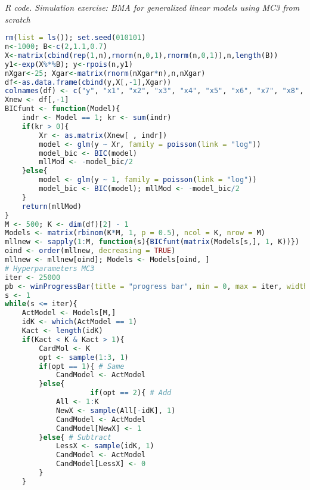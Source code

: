 \begin{tcolorbox}[enhanced,width=4.67in,center upper,
	fontupper=\large\bfseries,drop shadow southwest,sharp corners]
	\textit{R code. Simulation exercise: BMA for generalized linear models using MC3 from scratch}
	\begin{VF}
		\begin{lstlisting}[language=R]
rm(list = ls()); set.seed(010101)
n<-1000; B<-c(2,1.1,0.7)
X<-matrix(cbind(rep(1,n),rnorm(n,0,1),rnorm(n,0,1)),n,length(B))
y1<-exp(X%*%B); y<-rpois(n,y1)
nXgar<-25; Xgar<-matrix(rnorm(nXgar*n),n,nXgar)
df<-as.data.frame(cbind(y,X[,-1],Xgar))
colnames(df) <- c("y", "x1", "x2", "x3", "x4", "x5", "x6", "x7", "x8", "x9", "x10", "x11", "x12", "x13", "x14", "x15", "x16", "x17", "x18", "x19", "x20", "x21", "x22", "x23", "x24", "x25", "x26", "x27")
Xnew <- df[,-1]
BICfunt <- function(Model){
	indr <- Model == 1; kr <- sum(indr)
	if(kr > 0){
		Xr <- as.matrix(Xnew[ , indr])
		model <- glm(y ~ Xr, family = poisson(link = "log"))
		model_bic <- BIC(model)
		mllMod <- -model_bic/2
	}else{
		model <- glm(y ~ 1, family = poisson(link = "log"))
		model_bic <- BIC(model); mllMod <- -model_bic/2
	}
	return(mllMod)
}
M <- 500; K <- dim(df)[2] - 1
Models <- matrix(rbinom(K*M, 1, p = 0.5), ncol = K, nrow = M)
mllnew <- sapply(1:M, function(s){BICfunt(matrix(Models[s,], 1, K))})
oind <- order(mllnew, decreasing = TRUE)
mllnew <- mllnew[oind]; Models <- Models[oind, ]
# Hyperparameters MC3
iter <- 25000
pb <- winProgressBar(title = "progress bar", min = 0, max = iter, width = 300)
s <- 1
while(s <= iter){
	ActModel <- Models[M,]
	idK <- which(ActModel == 1)
	Kact <- length(idK)
	if(Kact < K & Kact > 1){
		CardMol <- K
		opt <- sample(1:3, 1)
		if(opt == 1){ # Same
			CandModel <- ActModel
		}else{
					if(opt == 2){ # Add
			All <- 1:K
			NewX <- sample(All[-idK], 1)
			CandModel <- ActModel
			CandModel[NewX] <- 1
		}else{ # Subtract
			LessX <- sample(idK, 1)
			CandModel <- ActModel
			CandModel[LessX] <- 0
		}
	}
\end{lstlisting}
	\end{VF}
\end{tcolorbox} 

